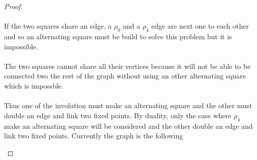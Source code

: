 \begin{proof}
\paragraph{}
If the two squares share an edge, a $\rho_0$ and a $\rho_4$ edge are next one to each other and so an alternating square must be build to solve this problem but it is impossible.

\paragraph{}
The two squares cannot share all their vertices because it will not be able to be connected two the rest of the graph without using an other alternating square which is impossble.

\paragraph{}
Thus one of the involution must make an alternating square and the other must double an edge and link two fixed points. By duality, only the case where $\rho_4$ make an alternating square will be considered and the other double an edge and link two fixed points. Currently the graph is the following

\begin{figure}[H]
  \begin{center}
\end{center}
\end{figure}
\end{proof}
